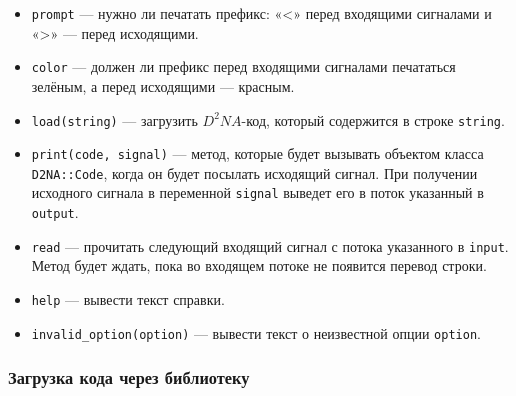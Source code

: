 \documentclass[utf8,a5paper,portrait,10pt,twoside]{eskdtext}
\begin{document}
\begin{itemize}
\begin{itemize}
          \item \texttt{prompt} — нужно ли печатать префикс: «<» перед
                входящими сигналами и «>» — перед исходящими.
          \item \texttt{color} — должен ли префикс перед входящими сигналами
                печататься зелёным, а перед исходящими — красным.
          \item \texttt{load(string)} — загрузить $D^2NA$-код, который
                содержится в строке \texttt{string}.
          \item \texttt{print(code, signal)} — метод, которые будет вызывать
                объектом класса \texttt{D2NA::Code}, когда он будет посылать
                исходящий сигнал. При получении исходного сигнала в переменной
                \texttt{signal} выведет его в поток указанный в \texttt{output}.
          \item \texttt{read} — прочитать следующий входящий сигнал с потока
                указанного в \texttt{input}. Метод будет ждать, пока во
                входящем потоке не появится перевод строки.
          \item \texttt{help} — вывести текст справки.
          \item \texttt{invalid\_option(option)} — вывести текст о неизвестной
                опции \texttt{option}.
        \end{itemize}
\end{itemize}

\subsubsection{Загрузка кода через библиотеку}
\end{document}
